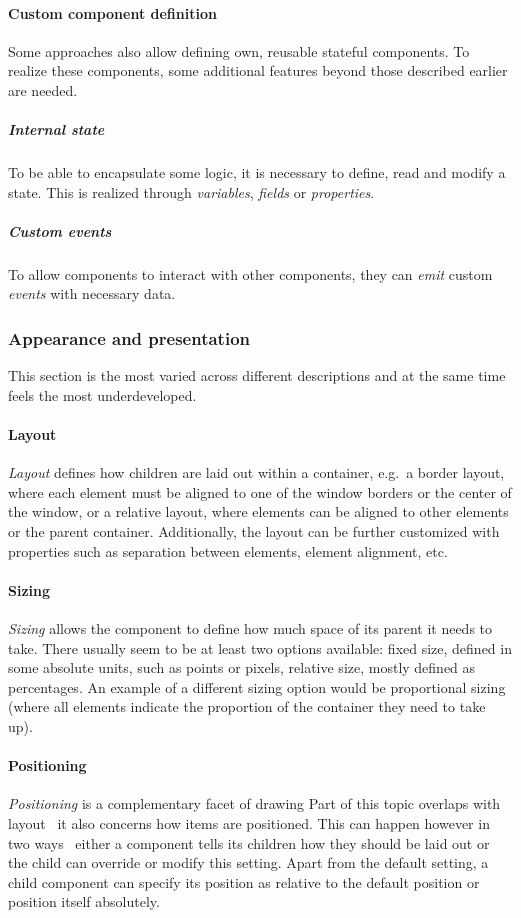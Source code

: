\paragraph{Custom component definition}
Some approaches also allow defining own, reusable stateful components.
To realize these components, some additional features beyond those described earlier are needed.

\subparagraph{Internal state}
To be able to encapsulate some logic, it is necessary to define, read and modify a state.
This is realized through \emph{variables}, \emph{fields} or \emph{properties}.

\subparagraph{Custom events}
To allow components to interact with other components, they can \emph{emit} custom \emph{events} with necessary data.

\subsubsection{Appearance and presentation}
This section is the most varied across different descriptions and at the same time feels the most underdeveloped.

\paragraph{Layout}
\emph{Layout} defines how children are laid out within a container, e.g.\ a border layout, where each element must be aligned to one of the window borders or the center of the window, or a relative layout, where elements can be aligned to other elements or the parent container.
Additionally, the layout can be further customized with properties such as separation between elements, element alignment, etc.

\paragraph{Sizing}
\emph{Sizing} allows the component to define how much space of its parent it needs to take.
There usually seem to be at least two options available: fixed size, defined in some absolute units, such as points or pixels, relative size, mostly defined as percentages.
An example of a different sizing option would be proportional sizing (where all elements indicate the proportion of the container they need to take up).

\paragraph{Positioning}
\emph{Positioning} is a complementary facet of drawing
Part of this topic overlaps with layout \textendash\ it also concerns how items are positioned.
This can happen however in two ways \textendash\ either a component tells its children how they should be laid out or the child can override or modify this setting.
Apart from the default setting, a child component can specify its position as relative to the default position or position itself absolutely.

